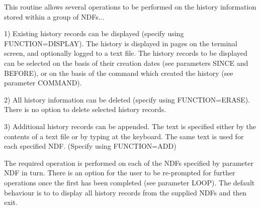 \documentclass[11pt,nolof,noabs]{starlink}
\begin{document}
\begin{small}
{{      This routine allows several operations to be performed on the
      history information stored within a group of NDFs...

      1) Existing history records can be displayed (specify using
      FUNCTION=DISPLAY). The history is displayed in pages on the
      terminal screen, and optionally logged to a text file. The
      history records to be displayed can be selected on the basis of
      their creation dates (see parameters SINCE and BEFORE), or on the
      basis of the command which created the history (see parameter
      COMMAND).

      2) All history information can be deleted (specify using
      FUNCTION=ERASE). There is no option to delete selected history
      records.

      3) Additional history records can be appended. The text is
      specified either by the contents of a text file or by typing at
      the keyboard. The same text is used for each specified NDF.
      (Specify using FUNCTION=ADD)

      The required operation is performed on each of the NDFs specified
      by parameter NDF in turn.  There is an option for the user to be
      re-prompted for further operations once the first has been
      completed (see parameter LOOP).  The default behaviour is to to
      display all history records from the supplied NDFs and then exit.

}}
\end{small}
\end{document}
